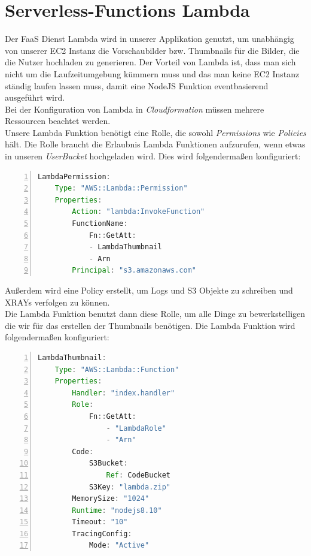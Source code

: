 \documentclass[a4paper, 12pt]{scrreprt}
\renewcommand\_{\textunderscore\allowbreak}
\begin{document}
\section{Serverless-Functions Lambda}
Der FaaS Dienst Lambda wird in unserer Applikation genutzt, um unabhängig von unserer EC2 Instanz die Vorschaubilder bzw. Thumbnails für die Bilder, die die Nutzer hochladen zu generieren. Der Vorteil von Lambda ist, dass man sich nicht um die Laufzeitumgebung kümmern muss und das man keine EC2 Instanz ständig laufen lassen muss, damit eine NodeJS Funktion eventbasierend ausgeführt wird. \\ 
Bei der Konfiguration von Lambda in \textit{Cloudformation} müssen mehrere Ressourcen beachtet werden. \\
Unsere Lambda Funktion benötigt eine Rolle, die sowohl \textit{Permissions} wie \textit{Policies} hält. Die Rolle braucht die Erlaubnis Lambda Funktionen aufzurufen, wenn etwas in unseren \textit{UserBucket} hochgeladen wird. Dies wird folgendermaßen konfiguriert:

\begin{lstlisting}[xleftmargin=\parindent,numbers=left,numberstyle=\small,numbersep=8pt,frame=L,mathescape=true, basicstyle=\small, language=Java, lineskip={1.0pt}]
LambdaPermission:
    Type: "AWS::Lambda::Permission"
    Properties: 
        Action: "lambda:InvokeFunction"
        FunctionName:
            Fn::GetAtt:
            - LambdaThumbnail
            - Arn
        Principal: "s3.amazonaws.com"
\end{lstlisting}

Außerdem wird eine Policy erstellt, um Logs und S3 Objekte zu schreiben und XRAYs verfolgen zu können.\\
Die Lambda Funktion benutzt dann diese Rolle, um alle Dinge zu bewerkstelligen die wir für das erstellen der Thumbnails benötigen. Die Lambda Funktion wird folgendermaßen konfiguriert:

\begin{lstlisting}[xleftmargin=\parindent,numbers=left,numberstyle=\small,numbersep=8pt,frame=L,mathescape=true, basicstyle=\small, language=Java, lineskip={1.0pt}]
LambdaThumbnail:
    Type: "AWS::Lambda::Function"
    Properties: 
        Handler: "index.handler"
        Role: 
            Fn::GetAtt: 
                - "LambdaRole"
                - "Arn"
        Code:
            S3Bucket:
                Ref: CodeBucket
            S3Key: "lambda.zip"
        MemorySize: "1024"
        Runtime: "nodejs8.10"
        Timeout: "10"
        TracingConfig:
            Mode: "Active"
\end{lstlisting}
\end{document}
